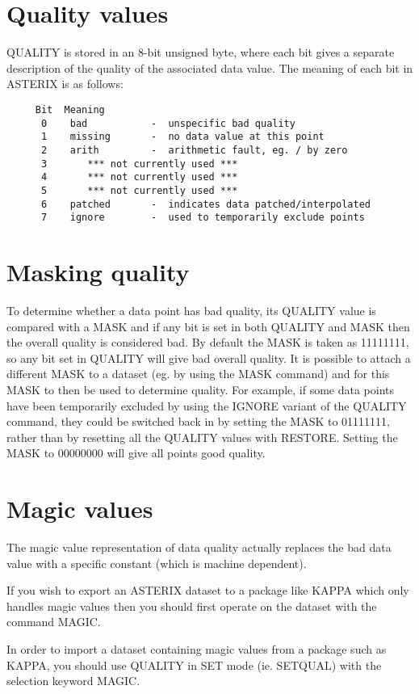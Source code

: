 \documentclass{book}
\renewcommand{\_}{{\tt\char'137}}     %
\begin{document}
\section{Quality values}
QUALITY is stored in an 8-bit unsigned byte, where each bit gives a
separate description of the quality of the associated data value. The
meaning of each bit in ASTERIX is as follows:
 
\begin{verbatim}
     Bit  Meaning
      0    bad           -  unspecific bad quality
      1    missing       -  no data value at this point
      2    arith         -  arithmetic fault, eg. / by zero
      3       *** not currently used ***
      4       *** not currently used ***
      5       *** not currently used ***
      6    patched       -  indicates data patched/interpolated
      7    ignore        -  used to temporarily exclude points
\end{verbatim}
\section{Masking quality}
To determine whether a data point has bad quality, its QUALITY value
is compared with a MASK and if any bit is set in both QUALITY and MASK
then the overall quality is considered bad. By default the MASK is taken
as 11111111, so any bit set in QUALITY will give bad overall quality.
It is possible to attach a different MASK to a dataset (eg. by using
the MASK command) and for this MASK to then be used to determine
quality. For example, if some data points have been temporarily
excluded by using the IGNORE variant of the QUALITY command, they could
be switched back in by setting the MASK to 01111111, rather than by
resetting all the QUALITY values with RESTORE. Setting the MASK to
00000000 will give all points good quality.
 
\section{Magic values}
The magic value representation of data quality actually replaces the
bad data value with a specific constant (which is machine dependent).
 
If you wish to export an ASTERIX dataset to a package like KAPPA which
only handles magic values then you should first operate on the dataset
with the command MAGIC.
 
In order to import a dataset containing magic values from a package
such as KAPPA, you should use QUALITY in SET mode (ie. SETQUAL) with
the selection keyword MAGIC.
 
\end{document}
